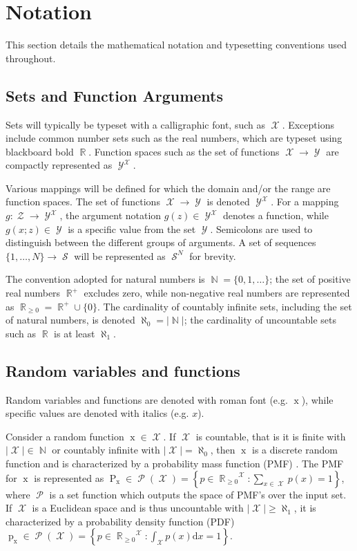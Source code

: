 \documentclass[12pt]{article}
\DeclareMathOperator{\xrm}{\mathrm{x}}
\DeclareMathOperator{\Prm}{\mathrm{P}}
\DeclareMathOperator{\prm}{\mathrm{p}}
\DeclareMathOperator{\Xcal}{\mathcal{X}}
\DeclareMathOperator{\Ycal}{\mathcal{Y}}
\DeclareMathOperator{\Zcal}{\mathcal{Z}}
\DeclareMathOperator{\Scal}{\mathcal{S}}
\DeclareMathOperator{\Pcal}{\mathcal{P}}
\DeclareMathOperator{\Rbb}{\mathbb{R}}
\DeclareMathOperator{\Nbb}{\mathbb{N}}
\begin{document}
\section{Notation}

This section details the mathematical notation and typesetting conventions used throughout.


\subsection*{Sets and Function Arguments}

Sets will typically be typeset with a calligraphic font, such as $\Xcal$. Exceptions include common number sets such as the real numbers, which are typeset using blackboard bold $\Rbb$. Function spaces such as the set of functions $\Xcal \to \Ycal$ are compactly represented as $\Ycal^{\Xcal}$.

Various mappings will be defined for which the domain and/or the range are function spaces. The set of functions $\Xcal \to \Ycal$ is denoted $\Ycal^{\Xcal}$. For a mapping $g : \Zcal \to \Ycal^{\Xcal}$, the argument notation $g(z) \in \Ycal^{\Xcal}$ denotes a function, while $g(x;z) \in \Ycal$ is a specific value from the set $\Ycal$. Semicolons are used to distinguish between the different groups of arguments. A set of sequences $\{1,\ldots,N\} \to \Scal$ will be represented as $\Scal^N$ for brevity.

The convention adopted for natural numbers is $\Nbb = \{0,1,\ldots\}$; the set of positive real numbers $\Rbb^+$ excludes zero, while non-negative real numbers are represented as $\Rbb_{\geq 0} = \Rbb^+ \cup \{0\}$. The cardinality of countably infinite sets, including the set of natural numbers, is denoted $\aleph_0 = |\Nbb|$; the cardinality of uncountable sets such as $\Rbb$ is at least $\aleph_1$.




\subsection*{Random variables and functions}

Random variables and functions are denoted with roman font (e.g. $\xrm$), while specific values are denoted with italics (e.g. $x$). 

Consider a random function $\xrm \in \Xcal$. If $\Xcal$ is countable, that is it is finite with $|\Xcal| \in \Nbb$ or countably infinite with $|\Xcal| = \aleph_0$, then $\xrm$ is a discrete random function and is characterized by a probability mass function (PMF) \cite {papoulis}. The PMF for $\xrm$ is represented as $\Prm_{\xrm} \in \Pcal(\Xcal) = \left\{ p \in {\Rbb_{\geq 0}}^{\Xcal}: \sum_{x \in \Xcal} p(x) = 1 \right\}$, where $\Pcal$ is a set function which outputs the space of PMF's over the input set. If $\Xcal$ is a Euclidean space and is thus uncountable with $|\Xcal| \geq \aleph_1$, it is characterized by a probability density function (PDF) $\prm_{\xrm} \in \Pcal(\Xcal) = \left\{ p \in {\Rbb_{\geq 0}}^{\Xcal}: \int_{\Xcal} p(x) \mathrm{d}x = 1 \right\}$.
\end{document}
